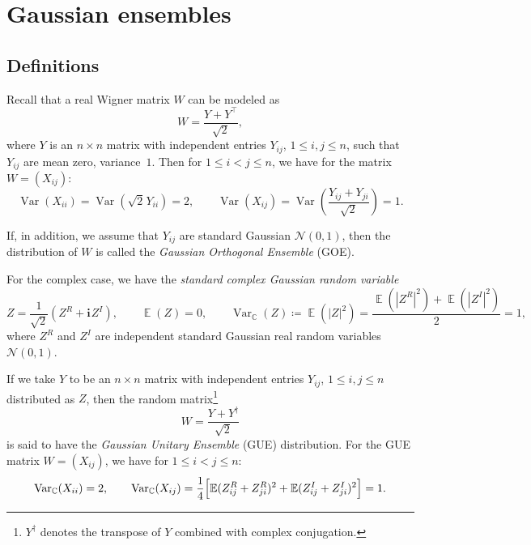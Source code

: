 \documentclass[letterpaper,11pt,oneside,reqno]{article}
\numberwithin{equation}{section}
\newcommand{\ssp}{\hspace{1pt}}
\theoremstyle{definition}
\begin{document}
\section{Gaussian ensembles}

\subsection{Definitions}
\label{sub:GOE_GUE_definitons}

Recall that a real Wigner matrix $W$ can be modeled as
\begin{equation*}
	W=\frac{Y+Y^\top}{\sqrt{2}},
\end{equation*}
where $Y$ is an $n\times n$ matrix with independent entries $Y_{ij}$,
$1\le i,j\le n$, such that $Y_{ij}$ are mean zero, variance~$1$.
Then for $1\le i<j\le n$, we have for the matrix
$W=(X_{ij})$:
\begin{equation*}
	\operatorname{\mathrm{Var}}\left( X_{ii} \right)=
	\operatorname{\mathrm{Var}}( \sqrt 2\ssp Y_{ii} )=2,\qquad
	\operatorname{\mathrm{Var}}\left( X_{ij} \right)=
	\operatorname{\mathrm{Var}}\left( \frac{Y_{ij}+Y_{ji}}{\sqrt 2} \right)=1.
\end{equation*}

If, in addition, we assume that $Y_{ij}$ are standard Gaussian
$\mathcal{N}(0,1)$, then the distribution of $W$ is called
the \emph{Gaussian Orthogonal Ensemble} (GOE).

For the complex case, we
have the \emph{standard complex Gaussian random variable}
\begin{equation*}
	Z=\frac{1}{\sqrt 2}\left( Z^R+\mathbf{i}\ssp Z^I \right),
	\qquad
	\operatorname{\mathbb{E}} (Z)=0,
	\qquad
	\operatorname{\mathrm{Var}}_{\mathbb{C}}(Z)\coloneqq
	\operatorname{\mathbb{E}} (|Z|^2)=
	\frac{
	\operatorname{\mathbb{E}} (|Z^R|^2)+
	\operatorname{\mathbb{E}} (|Z^I|^2)}{2}=1
	,
\end{equation*}
where $Z^R$ and $Z^I$ are independent
standard Gaussian real random variables $\mathcal{N}(0,1)$.

If we take $Y$ to be an $n\times n$ matrix with independent
entries $Y_{ij}$, $1\le i,j\le n$
distributed as $Z$, then the random matrix\footnote{$Y^\dagger$ denotes the transpose of $Y$ combined with complex conjugation.}
\begin{equation*}
	W=\frac{Y+Y^\dagger}{\sqrt 2}
\end{equation*}
is said to have the \emph{Gaussian Unitary Ensemble} (GUE) distribution.
For the GUE matrix $W=(X_{ij})$, 
we have for $1\le i<j\le n$:
\begin{equation*}
	\operatorname{\mathrm{Var}}_{\mathbb{C}}(X_{ii})=2,
	\qquad
	\operatorname{\mathrm{Var}}_{\mathbb{C}}(X_{ij})
	=\frac{1}{4}
	\Bigl[ \operatorname{\mathbb{E}}(Z_{ij}^R
			+
		Z_{ji}^R)^2
		+
		\operatorname{\mathbb{E}}(Z_{ij}^I
			+
		Z_{ji}^I)^2
	\Bigr]
	=1.
\end{equation*}
\end{document}
